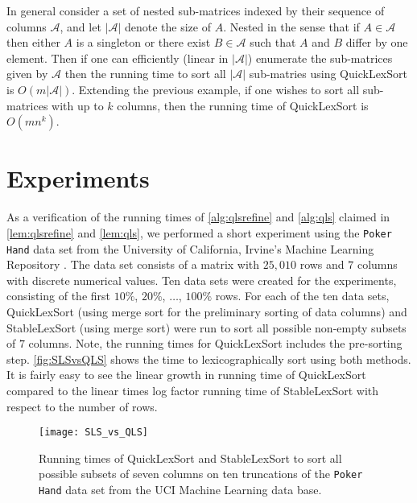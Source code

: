 \documentclass[a4paper,10pt,reqno]{amsart}
\theoremstyle{definition}
\begin{document}
In general consider a set of nested sub-matrices indexed by their sequence of
columns $\mathcal A$, and let $|\mathcal A|$ denote the size of $A$. Nested in
the sense that if $A \in \mathcal A$ then either $A$ is a singleton or there
exist $B \in \mathcal A$ such that $A$ and $B$ differ by one element. Then if
one can efficiently (linear in $|\mathcal A|$) enumerate the sub-matrices given
by $\mathcal A$ then the running time to sort all $| \mathcal A|$ sub-matries
using QuickLexSort is $O(m | \mathcal A |)$.  Extending the previous example,
if one wishes to sort all sub-matrices with up to $k$ columns, then the
running time of QuickLexSort is $O(m n^k)$.



\section{Experiments}
\label{sec:experiments}
As a verification of the running times of \autoref{alg:qlsrefine} and
\autoref{alg:qls} claimed in \autoref{lem:qlsrefine} and \autoref{lem:qls}, we
performed a short experiment using the {\tt Poker Hand} data set from the
University of California, Irvine's Machine Learning Repository
\cite{Bache+Lichman:2013}. The data set consists of a matrix with $25,010$ rows
and $7$ columns with discrete numerical values. Ten data sets were created for
the experiments, consisting of the first $10\%$, $20\%$, $\ldots$, $100\%$
rows. For each of the ten data sets, QuickLexSort (using merge sort for the
preliminary sorting of data columns) and StableLexSort (using merge sort) were
run to sort all possible non-empty subsets of $7$ columns. Note, the running
times for QuickLexSort includes the pre-sorting step.
\autoref{fig:SLSvsQLS} shows the time to lexicographically sort using both
methods. It is fairly easy to see the linear growth in running time of
QuickLexSort compared to the linear times log factor running time of StableLexSort with
respect to the number of rows.

\begin{figure}
    \begin{center}
    \texttt{[image: SLS\_vs\_QLS]}
    \end{center}
    \caption{Running times of QuickLexSort and StableLexSort to sort all
    possible subsets of seven columns on ten truncations of the {\tt Poker
Hand} data set from the UCI Machine Learning data base.}
\label{fig:SLSvsQLS}
\end{figure}
\end{document}

